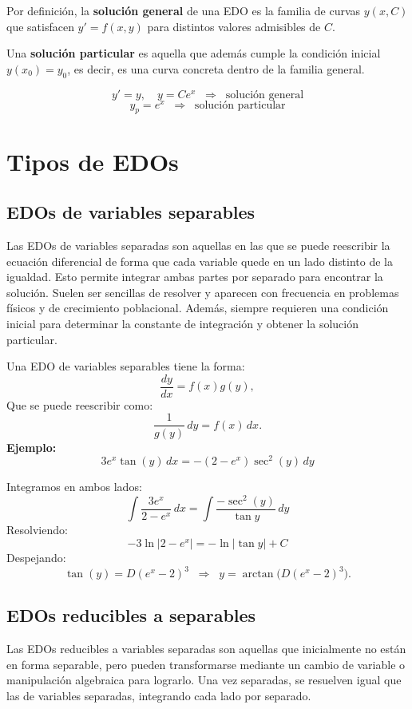 \documentclass[a4paper,12pt]{article}
\begin{document}
\medskip
\noindent
Por definición, la \textbf{solución general} de una EDO es la familia de curvas $y(x,C)$ que satisfacen $y'=f(x,y)$ para distintos valores admisibles de $C$.  

\medskip
\noindent
Una \textbf{solución particular} es aquella que además cumple la condición inicial $y(x_0)=y_0$,  
es decir, es una curva concreta dentro de la familia general.

\[
y' = y, \quad y = C e^x \;\; \Rightarrow \;\; \text{solución general}
\]
\[
y_p = e^x \;\; \Rightarrow \;\; \text{solución particular}
\]

\section{Tipos de EDOs}

\subsection{EDOs de variables separables}
\noindent
Las EDOs de variables separadas son aquellas en las que se puede reescribir la ecuación diferencial 
de forma que cada variable quede en un lado distinto de la igualdad. Esto permite integrar ambas 
partes por separado para encontrar la solución. Suelen ser sencillas de resolver y aparecen con 
frecuencia en problemas físicos y de crecimiento poblacional. Además, siempre requieren una condición 
inicial para determinar la constante de integración y obtener la solución particular.

\medskip
\noindent
Una EDO de variables separables tiene la forma:
\[
\frac{dy}{dx} = f(x)g(y),
\]
Que se puede reescribir como:
\[
\frac{1}{g(y)}\,dy = f(x)\,dx.
\]
\noindent
\textbf{Ejemplo:}
\[
3 e^x \tan(y)\, dx = -(2 - e^x)\sec^2(y)\, dy
\]

\medskip
\noindent
Integramos en ambos lados:
\[
\int \frac{3e^x}{2-e^x}\,dx = \int \frac{-\sec^2(y)}{\tan y}\,dy
\]
Resolviendo:
\[
-3 \ln|2-e^x| = -\ln|\tan y| + C
\]
Despejando:
\[
\tan(y) = D (e^x-2)^3 \;\;\Rightarrow\;\; y = \arctan\!\big(D(e^x-2)^3\big).
\]
\newpage
\subsection{EDOs reducibles a separables}
\noindent
Las EDOs reducibles a variables separadas son aquellas que inicialmente no están 
en forma separable, pero pueden transformarse mediante un cambio de variable o 
manipulación algebraica para lograrlo. Una vez separadas, se resuelven igual que 
las de variables separadas, integrando cada lado por separado.
\end{document}
